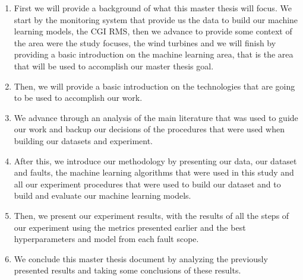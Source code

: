 \begin{enumerate}
    \item
First we will provide a background of what this master thesis will focus. We start by the monitoring system that provide us the data to build our machine learning models, the CGI RMS, then we advance to provide some context of the area were the study focuses, the wind turbines and we will finish by providing a basic introduction on the machine learning area, that is the area that will be used to accomplish our master thesis goal.

\item
Then, we will provide a basic introduction on the technologies that are going to be used to accomplish our work.

\item
We advance through an analysis of the main literature that was used to guide our work and backup our decisions of the procedures that were used when building our datasets and experiment.

\item
After this, we introduce our methodology by presenting our data, our dataset and faults, the machine learning algorithms that were used in this study and all our experiment procedures that were used to build our dataset and to build and evaluate our machine learning models.

\item
Then, we present our experiment results, with the results of all the steps of our experiment using the metrics presented earlier and the best hyperparameters and model from each fault scope.

\item
We conclude this master thesis document by analyzing the previously presented results and taking some conclusions of these results.

\end{enumerate}
